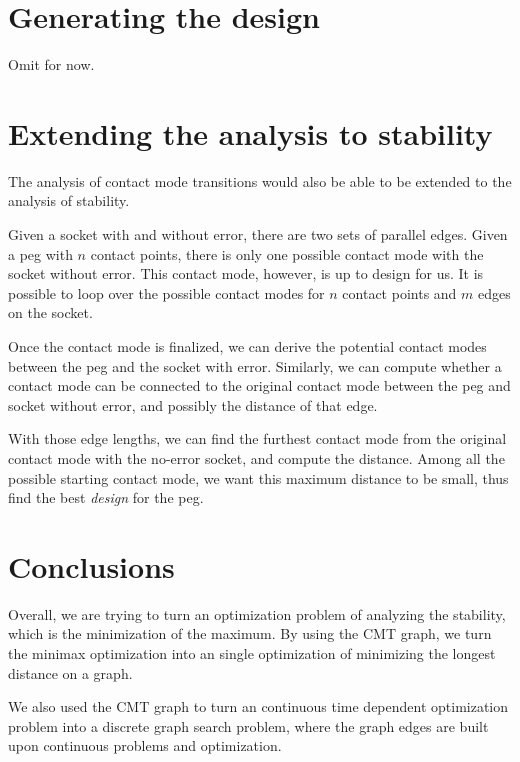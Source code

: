 \documentclass[11p]{article}
\begin{document}
\section{Generating the design}

Omit for now. 

\section{Extending the analysis to stability}

The analysis of contact mode transitions would also be able to be extended to the analysis of stability.

Given a socket with and without error, there are two sets of parallel edges. Given a peg with $n$ contact points, there is only one possible contact mode with the socket without error. This contact mode, however, is up to design for us. It is possible to loop over the possible contact modes for $n$ contact points and $m$ edges on the socket. 

Once the contact mode is finalized, we can derive the potential contact modes between the peg and the socket with error. Similarly, we can compute whether a contact mode can be connected to the original contact mode between the peg and socket without error, and possibly the distance of that edge. 

With those edge lengths, we can find the furthest contact mode from the original contact mode with the no-error socket, and compute the distance. Among all the possible starting contact mode, we want this maximum distance to be small, thus find the best {\em design} for the peg. 


\section{Conclusions}


Overall, we are trying to turn an optimization problem of analyzing the stability, which is the minimization of the maximum. By using the CMT graph, we turn the minimax optimization into an single optimization of minimizing the longest distance on a graph. 

We also used the CMT graph to turn an continuous time dependent optimization problem into a discrete graph search problem, where the graph edges are built upon continuous problems and optimization. 
\end{document}
